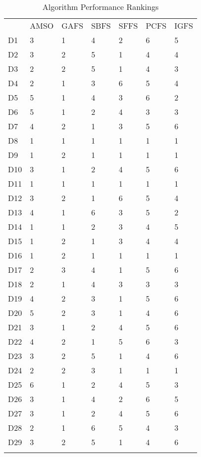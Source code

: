 \begin{table}
\caption{Algorithm Performance Rankings}
\label{tbl:algorithm:rank}
\begin{tabular}{lllllll}
\noalign{\smallskip}\hline\noalign{\smallskip}
&AMSO&GAFS&SBFS&SFFS&PCFS&IGFS\\
\noalign{\smallskip}\hline
D1&3&1&4&2&6&5\\
D2&3&2&5&1&4&4\\
D3&2&2&5&1&4&3\\
D4&2&1&3&6&5&4\\
D5&5&1&4&3&6&2\\
D6&5&1&2&4&3&3\\
D7&4&2&1&3&5&6\\
D8&1&1&1&1&1&1\\
D9&1&2&1&1&1&1\\
D10&3&1&2&4&5&6\\
D11&1&1&1&1&1&1\\
D12&3&2&1&6&5&4\\
D13&4&1&6&3&5&2\\
D14&1&1&2&3&4&5\\
D15&1&2&1&3&4&4\\
D16&1&2&1&1&1&1\\
D17&2&3&4&1&5&6\\
D18&2&1&4&3&3&3\\
D19&4&2&3&1&5&6\\
D20&5&2&3&1&4&6\\
D21&3&1&2&4&5&6\\
D22&4&2&1&5&6&3\\
D23&3&2&5&1&4&6\\
D24&2&2&3&1&1&1\\
D25&6&1&2&4&5&3\\
D26&3&1&4&2&6&5\\
D27&3&1&2&4&5&6\\
D28&2&1&6&5&4&3\\
D29&3&2&5&1&4&6\\
\noalign{\smallskip}\hline
\end{tabular}
\end{table}
